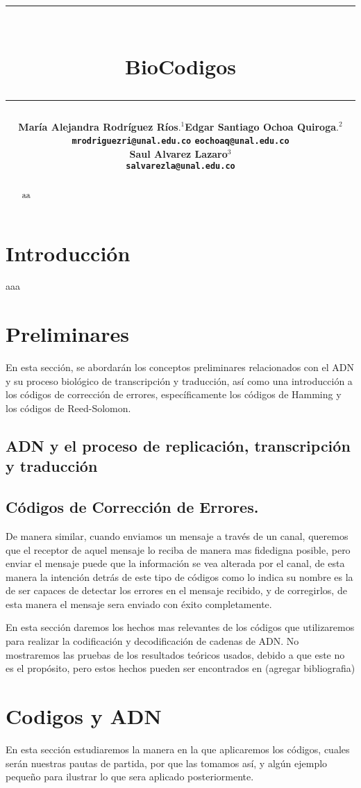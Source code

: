 \documentclass[12pt]{article}
\title{\vspace{-2cm}\par\noindent\rule{16cm}{1pt}\large
\\\bfseries BioCodigos
\vspace{-0.34cm}\par\noindent\hspace{0.15cm}\rule{16cm}{1pt}
\vspace{-0.6cm}
}
\author{\small \bfseries María Alejandra Rodríguez Ríos$.^1$\quad \quad\small Edgar Santiago Ochoa Quiroga$.^{2}$\\ \small \quad \texttt{mrodriguezri@unal.edu.co} \quad \quad \quad \quad \quad \quad \texttt{eochoaq@unal.edu.co}\quad\quad \quad\\ \small \bfseries Saul Alvarez Lazaro$^{3}$\\
\small \texttt{salvarezla@unal.edu.co}
}
\begin{document}
\maketitle
\begin{abstract}
aa
\end{abstract}

\section{Introducción}

aaa



\section{Preliminares}
En esta sección, se abordarán los conceptos preliminares relacionados con el ADN y su proceso biológico de transcripción y traducción, así como una introducción a los códigos de corrección de errores, específicamente los códigos de Hamming y los códigos de Reed-Solomon.
\subsection{ADN y el proceso de replicación, transcripción y traducción}

\subsection{Códigos de Corrección de Errores.}
De manera similar, cuando enviamos un mensaje a través de un canal, queremos que el receptor de aquel mensaje lo reciba de manera mas fidedigna posible, pero enviar el mensaje puede que la información se vea alterada por el canal, de esta manera la intención detrás de este tipo de códigos como lo indica su nombre es la de ser capaces de detectar los errores en el mensaje recibido, y de corregirlos, de esta manera el mensaje sera enviado con éxito completamente.

En esta sección daremos los hechos mas relevantes de los códigos que utilizaremos para realizar la codificación y decodificación de cadenas de ADN. No mostraremos las pruebas de los resultados teóricos usados, debido a que este no es el propósito, pero estos hechos pueden ser encontrados en (agregar bibliografia)


\section{Codigos y ADN}
En esta sección estudiaremos la manera en la que aplicaremos los códigos, cuales serán nuestras pautas de partida, por que las tomamos así, y algún ejemplo pequeño para ilustrar lo que sera aplicado posteriormente.






\nocite{*}
\end{document}

